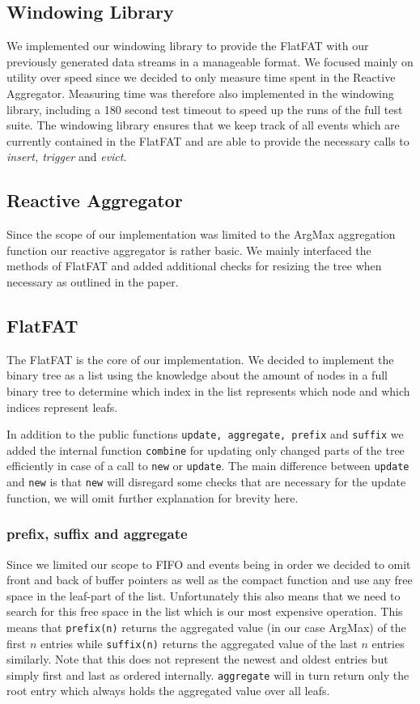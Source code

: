 \subsection{Windowing Library}
We implemented our windowing library to provide the FlatFAT with our previously generated
data streams in a manageable format. We focused mainly on utility over speed since we
decided to only measure time spent in the Reactive Aggregator.
Measuring time was therefore also implemented in the windowing library, including a
180 second test timeout to speed up the runs of the full test suite. The windowing library
ensures that we keep track of all events which are currently contained in the FlatFAT
and are able to provide the necessary calls to \textit{insert, trigger} and \textit{evict}.

\subsection{Reactive Aggregator}
Since the scope of our implementation was limited to the ArgMax aggregation function
our reactive aggregator is rather basic. We mainly interfaced the methods of FlatFAT
and added additional checks for resizing the tree when necessary as outlined in the paper.

\subsection{FlatFAT}
The FlatFAT is the core of our implementation. We decided to implement the binary tree
as a list using the knowledge about the amount of nodes in a full binary tree to determine
which index in the list represents which node and which indices represent leafs.

In addition to the public functions \texttt{update, aggregate, prefix} and \texttt{suffix} we
added the internal function \texttt{combine} for updating only changed parts of the tree
efficiently in case of a call to \texttt{new} or \texttt{update}. The main difference between
\texttt{update} and \texttt{new} is that \texttt{new} will disregard some checks that are necessary for
the update function, we will omit further explanation for brevity here.

\subsubsection{prefix, suffix and aggregate}
Since we limited our scope to FIFO and events being in order we decided to omit
front and back of buffer pointers as well as the compact function and use any free
space in the leaf-part of the list. Unfortunately this also means that we need
to search for this free space in the list which is our most expensive operation.
This means that \texttt{prefix(n)} returns the aggregated value (in our case ArgMax) of the
first $n$ entries while \texttt{suffix(n)} returns the aggregated value of the last $n$ entries
similarly. Note that this does not represent the newest and oldest entries but simply
first and last as ordered internally.
\texttt{aggregate} will in turn return only the root entry which always holds the aggregated
value over all leafs.

